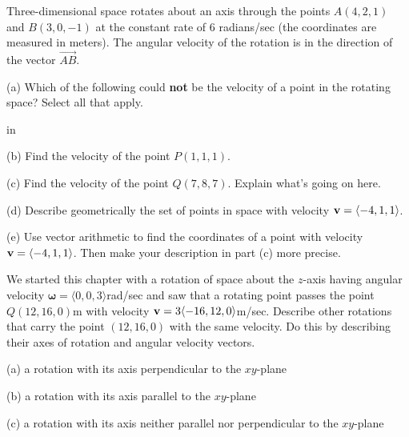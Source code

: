 \documentclass{ximera}
\newcommand{\pskip}{\vskip 0.1 in}
\begin{document}
\begin{question} \label{Qgdsnt:Cross}
Three-dimensional space rotates about an axis through the points $A(4,2,1)$ and $B(3,0,-1)$ at the constant rate of $6$ radians/sec (the coordinates are measured in meters). The angular velocity of the rotation is in the direction of the vector $\overrightarrow{AB}$. 

(a) Which of the following could {\bf not} be the velocity of a point in the rotating space? Select all that apply.

\begin{selectAll}  
  \end{selectAll}  


\pskip

(b) Find the velocity of the point $P(1,1,1)$.

(c) Find the velocity of the point $Q(7,8,7)$. Explain what's going on here.

(d) Describe geometrically the set of points in space with velocity ${\bf v} =\langle -4,1,1 \rangle$.

(e) Use vector arithmetic to find the coordinates of a point with velocity ${\bf v} =\langle -4,1,1 \rangle$. Then make your description in part (c) more precise.

\end{question}


\begin{exploration}


\end{exploration}



\begin{question}  \label{Q3254hv:Cross}
We started this chapter with a rotation of space about the $z$-axis having angular velocity $\boldsymbol{\omega} = \langle 0,0,3 \rangle$rad/sec and saw that a rotating point passes the point $Q(12,16,0)$m with velocity ${\bf v}= 3\langle -16,12,0\rangle$m/sec. Describe other rotations that carry the point $(12,16,0)$ with the same velocity. Do this by describing their axes of rotation and angular velocity vectors.

(a) a rotation with its axis perpendicular to the $xy$-plane

(b) a  rotation with its axis parallel to the $xy$-plane

(c) a rotation with its axis neither parallel nor perpendicular to the $xy$-plane
 
\end{question}
\end{document}

